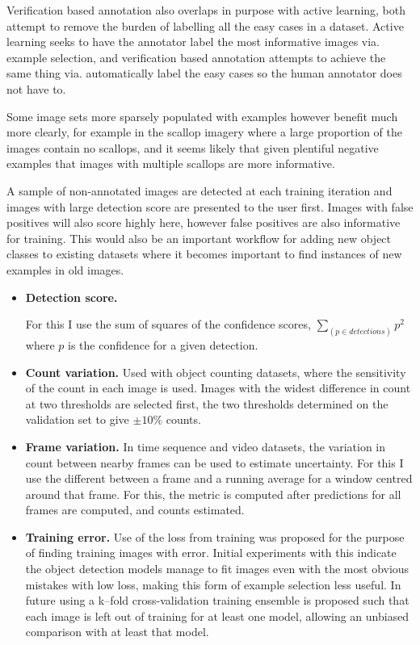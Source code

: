 Verification based annotation also overlaps in purpose with active learning, both attempt to remove the burden of labelling all the easy cases in a dataset. Active learning seeks to have the annotator label the most informative images via. example selection, and verification based annotation attempts to achieve the same thing via. automatically label the easy cases so the human annotator does not have to.

Some image sets more sparsely populated with examples however benefit much more clearly, for example in the scallop imagery where a large proportion of the images contain no scallops, and it seems likely that given plentiful negative examples that images with multiple scallops are more informative. 

A sample of non-annotated images are detected at each training iteration and images with large detection score are presented to the user first. Images with false positives will also score highly here, however false positives are also informative for training. This would also be an important workflow for adding new object classes to existing datasets where it becomes important to find instances of new examples in old images.


\begin{itemize}
\item {\bf Detection score. }

For this I use the sum of squares of the confidence scores, $ \sum_(p \in detections){ p^2 } $ where $p$ is the confidence for a given detection. 

    \item {\bf Count variation. }
Used with object counting datasets, where the sensitivity of the count in each image is used. Images with the widest difference in count at two thresholds are selected first, the two thresholds determined on the validation set to give $ \pm 10\% $ counts.
    \item {\bf Frame variation. } 
In time sequence and video datasets, the variation in count between nearby frames can be used to estimate uncertainty. For this I use the different between a frame and a running average for a window centred around that frame. For this, the metric is computed after predictions for all frames are computed, and counts estimated.
    \item {\bf Training error. }
Use of the loss from training was proposed for the purpose of finding training images with error. Initial experiments with this indicate the object detection models manage to fit images even with the most obvious mistakes with low loss, making this form of example selection less useful. In future using a k--fold cross-validation training ensemble is proposed such that each image is left out of training for at least one model, allowing an unbiased comparison with at least that model.
\end{itemize}
 



